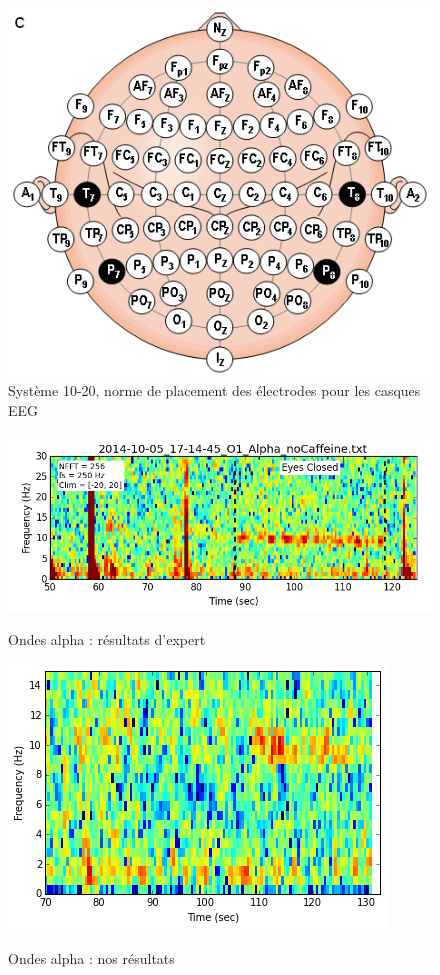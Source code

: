 \documentclass[11pt,a4paper]{article}
\theoremstyle{plain}
\theoremstyle{definition}
\begin{document}
\begin{figure}[h!]
\centering
\includegraphics[scale=0.4]{images/1020.png}
\caption{Système 10-20, norme de placement des électrodes pour les casques EEG}
\label{dix}
\end{figure}

\begin{figure}[h!]
\centering

\caption{Ondes alpha : résultats d'expert}
\includegraphics[scale=0.5]{images/eeghackerAlpha.png}
\label{eeghack}%
\end{figure}
\begin{figure}[h!]
\centering

\caption{Ondes alpha : nos résultats}
\includegraphics[scale=0.5]{images/ourAlpha.png}
\label{ouralph}%
\end{figure}
\end{document}
